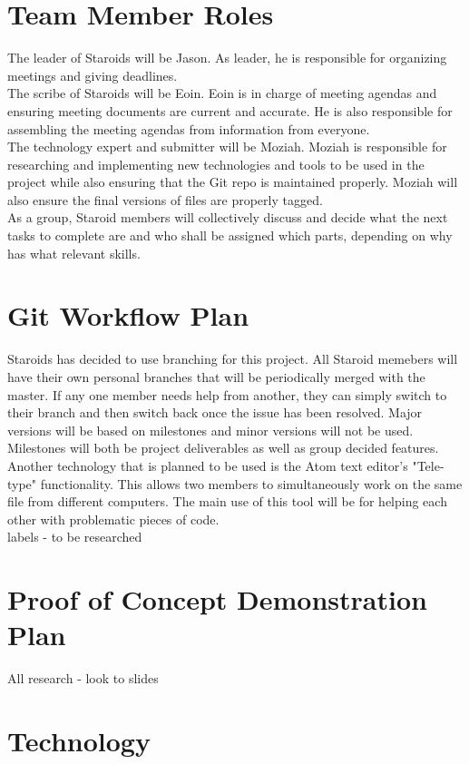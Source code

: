 \documentclass{article}
\begin{document}
\section{Team Member Roles}
The leader of Staroids will be Jason. As leader, he is responsible for organizing meetings and giving deadlines.\\
The scribe of Staroids will be Eoin. Eoin is in charge of meeting agendas and ensuring meeting documents are current and accurate. He is also responsible for assembling the meeting agendas from information from everyone.\\
The technology expert and submitter will be Moziah. Moziah is responsible for researching and implementing new technologies and tools to be used in the project while also ensuring that the Git repo is maintained properly. Moziah will also ensure the final versions of files are properly tagged.\\
As a group, Staroid members will collectively discuss and decide what the next tasks to complete are and who shall be assigned which parts, depending on why has what relevant skills.

\section{Git Workflow Plan}
Staroids has decided to use branching for this project. All Staroid memebers will have their own personal branches that will be periodically merged with the master. If any one member needs help from another, they can simply switch to their branch and then switch back once the issue has been resolved. Major versions will be based on milestones and minor versions will not be used. Milestones will both be project deliverables as well as group decided features. Another technology that is planned to be used is the Atom text editor's "Tele-type" functionality. This allows two members to simultaneously work on the same file from different computers. The main use of this tool will be for helping each other with problematic pieces of code.\\

labels - to be researched

\section{Proof of Concept Demonstration Plan}
All
research - look to slides

\section{Technology}
\end{document}

